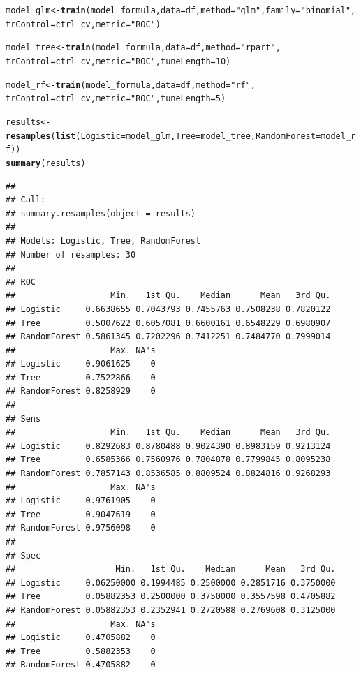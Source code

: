 \documentclass[14pt,a4paper]{extarticle}\usepackage[]{graphicx}\usepackage[]{xcolor}
\makeatletter
\newcommand{\hlnum}[1]{\textcolor[rgb]{0.686,0.059,0.569}{#1}}%
\newcommand{\hlsng}[1]{\textcolor[rgb]{0.192,0.494,0.8}{#1}}%
\newcommand{\hldef}[1]{\textcolor[rgb]{0.345,0.345,0.345}{#1}}%
\newcommand{\hlkwb}[1]{\textcolor[rgb]{0.69,0.353,0.396}{#1}}%
\newcommand{\hlkwc}[1]{\textcolor[rgb]{0.333,0.667,0.333}{#1}}%
\newcommand{\hlkwd}[1]{\textcolor[rgb]{0.737,0.353,0.396}{\textbf{#1}}}%
\newenvironment{kframe}{%
 \def\at@end@of@kframe{}%
 \ifinner\ifhmode%
  \def\at@end@of@kframe{\end{minipage}}%
  \begin{minipage}{\columnwidth}%
 \fi\fi%
 \def\FrameCommand##1{\hskip\@totalleftmargin \hskip-\fboxsep
 \colorbox{shadecolor}{##1}\hskip-\fboxsep
     \hskip-\linewidth \hskip-\@totalleftmargin \hskip\columnwidth}%
 \MakeFramed {\advance\hsize-\width
   \@totalleftmargin\z@ \linewidth\hsize
   \@setminipage}}%
 {\par\unskip\endMakeFramed%
 \at@end@of@kframe}
\newenvironment{knitrout}{}{} %
\makeatother
\begin{document}
\begin{knitrout}\scriptsize
{}\color{fgcolor}\begin{kframe}
\begin{alltt}
\hldef{model_glm} \hlkwb{<-} \hlkwd{train}\hldef{(model_formula,} \hlkwc{data} \hldef{= df,} \hlkwc{method} \hldef{=} \hlsng{"glm"}\hldef{,} \hlkwc{family} \hldef{=} \hlsng{"binomial"}\hldef{,}
                    \hlkwc{trControl} \hldef{= ctrl_cv,} \hlkwc{metric} \hldef{=} \hlsng{"ROC"}\hldef{)}

\hldef{model_tree} \hlkwb{<-} \hlkwd{train}\hldef{(model_formula,} \hlkwc{data} \hldef{= df,} \hlkwc{method} \hldef{=} \hlsng{"rpart"}\hldef{,}
                     \hlkwc{trControl} \hldef{= ctrl_cv,} \hlkwc{metric} \hldef{=} \hlsng{"ROC"}\hldef{,} \hlkwc{tuneLength} \hldef{=} \hlnum{10}\hldef{)}

\hldef{model_rf} \hlkwb{<-} \hlkwd{train}\hldef{(model_formula,} \hlkwc{data} \hldef{= df,} \hlkwc{method} \hldef{=} \hlsng{"rf"}\hldef{,}
                   \hlkwc{trControl} \hldef{= ctrl_cv,} \hlkwc{metric} \hldef{=} \hlsng{"ROC"}\hldef{,} \hlkwc{tuneLength} \hldef{=} \hlnum{5}\hldef{)}

\hldef{results} \hlkwb{<-} \hlkwd{resamples}\hldef{(}\hlkwd{list}\hldef{(}\hlkwc{Logistic} \hldef{= model_glm,} \hlkwc{Tree} \hldef{= model_tree,} \hlkwc{RandomForest} \hldef{= model_rf))}
\hlkwd{summary}\hldef{(results)}
\end{alltt}
\begin{verbatim}
## 
## Call:
## summary.resamples(object = results)
## 
## Models: Logistic, Tree, RandomForest 
## Number of resamples: 30 
## 
## ROC 
##                   Min.   1st Qu.    Median      Mean   3rd Qu.
## Logistic     0.6638655 0.7043793 0.7455763 0.7508238 0.7820122
## Tree         0.5007622 0.6057081 0.6600161 0.6548229 0.6980907
## RandomForest 0.5861345 0.7202296 0.7412251 0.7484770 0.7999014
##                   Max. NA's
## Logistic     0.9061625    0
## Tree         0.7522866    0
## RandomForest 0.8258929    0
## 
## Sens 
##                   Min.   1st Qu.    Median      Mean   3rd Qu.
## Logistic     0.8292683 0.8780488 0.9024390 0.8983159 0.9213124
## Tree         0.6585366 0.7560976 0.7804878 0.7799845 0.8095238
## RandomForest 0.7857143 0.8536585 0.8809524 0.8824816 0.9268293
##                   Max. NA's
## Logistic     0.9761905    0
## Tree         0.9047619    0
## RandomForest 0.9756098    0
## 
## Spec 
##                    Min.   1st Qu.    Median      Mean   3rd Qu.
## Logistic     0.06250000 0.1994485 0.2500000 0.2851716 0.3750000
## Tree         0.05882353 0.2500000 0.3750000 0.3557598 0.4705882
## RandomForest 0.05882353 0.2352941 0.2720588 0.2769608 0.3125000
##                   Max. NA's
## Logistic     0.4705882    0
## Tree         0.5882353    0
## RandomForest 0.4705882    0
\end{verbatim}
\end{kframe}
\end{knitrout}
\end{document}
